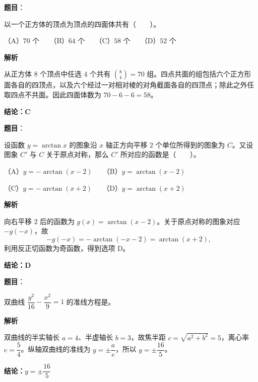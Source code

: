 \begin{answer}

\textbf{题目}：

以一个正方体的顶点为顶点的四面体共有\mbox{（　　）}。

（A）$70$ 个　　（B）$64$ 个　　（C）$58$ 个　　（D）$52$ 个

\textbf{解析}

从正方体 $8$ 个顶点中任选 $4$ 个共有 $\binom84=70$ 组。四点共面的组包括六个正方形面各自的四顶点，以及六个经过一对相对棱的对角截面各自的四顶点；除此之外任取四点不共面。因此四面体数为 $70-6-6=58$。

\textbf{结论：C}


\end{answer}
\begin{answer}

\textbf{题目}：

设函数 $y=\arctan x$ 的图象沿 $x$ 轴正方向平移 $2$ 个单位所得到的图象为 $C$。又设图象 $C'$ 与 $C$ 关于原点对称，那么 $C'$ 所对应的函数是\mbox{（　　）}。

（A）$y=-\arctan(x-2)$　　（B）$y=\arctan(x-2)$

（C）$y=-\arctan(x+2)$　　（D）$y=\arctan(x+2)$

\textbf{解析}

向右平移 $2$ 后的函数为 $g(x)=\arctan(x-2)$。关于原点对称的图象对应 $-g(-x)$，故
\nopagebreak[4]
\[
-g(-x)=-\arctan(-x-2)=\arctan(x+2),
\]
利用反正切函数为奇函数，得到选项 D。

\textbf{结论：D}


\end{answer}
\begin{answer}

\textbf{题目}：

双曲线 $\dfrac{y^2}{16}-\dfrac{x^2}{9}=1$ 的准线方程是\gkblank{}。

\textbf{解析}

双曲线的半实轴长 $a=4$、半虚轴长 $b=3$，故焦半距 $c=\sqrt{a^2+b^2}=5$，离心率 $e=\dfrac54$。纵轴双曲线的准线为 $y=\pm\dfrac{a}{e}$，所以 $y=\pm\dfrac{16}{5}$。

\textbf{结论：$y=\pm\dfrac{16}{5}$}


\end{answer}

